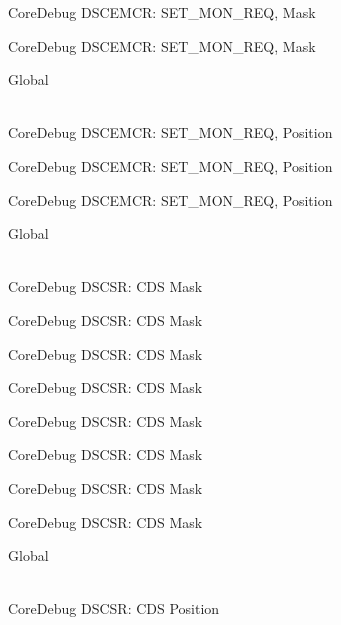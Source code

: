 \begin{DoxyRefList}
\label{deprecated__deprecated000527}%
%
Core\+Debug DSCEMCR\+: SET\+\_\+\+MON\+\_\+\+REQ, Mask 

\label{deprecated__deprecated000629}%
%
Core\+Debug DSCEMCR\+: SET\+\_\+\+MON\+\_\+\+REQ, Mask  
\item[{\parbox[t]{\linewidth}{Global \doxylink{group___c_m_s_i_s___s_c_b_ga77f02a6d773fa2c6daafbbdd7df2d9d2}{Core\+Debug\+\_\+\+DSCEMCR\+\_\+\+SET\+\_\+\+MON\+\_\+\+REQ\+\_\+\+Pos} }}]\hfill \\
\label{deprecated__deprecated000075}%
%
Core\+Debug DSCEMCR\+: SET\+\_\+\+MON\+\_\+\+REQ, Position 

\label{deprecated__deprecated000526}%
%
Core\+Debug DSCEMCR\+: SET\+\_\+\+MON\+\_\+\+REQ, Position 

\label{deprecated__deprecated000628}%
%
Core\+Debug DSCEMCR\+: SET\+\_\+\+MON\+\_\+\+REQ, Position  
\item[{\parbox[t]{\linewidth}{Global \doxylink{group___c_m_s_i_s___s_c_b_ga083417245e1aa40e84a2b12433a15a6b}{Core\+Debug\+\_\+\+DSCSR\+\_\+\+CDS\+\_\+\+Msk} }}]\hfill \\
\label{deprecated__deprecated000094}%
%
Core\+Debug DSCSR\+: CDS Mask 

\label{deprecated__deprecated000148}%
%
Core\+Debug DSCSR\+: CDS Mask 

\label{deprecated__deprecated000224}%
%
Core\+Debug DSCSR\+: CDS Mask 

\label{deprecated__deprecated000287}%
%
Core\+Debug DSCSR\+: CDS Mask 

\label{deprecated__deprecated000366}%
%
Core\+Debug DSCSR\+: CDS Mask 

\label{deprecated__deprecated000442}%
%
Core\+Debug DSCSR\+: CDS Mask 

\label{deprecated__deprecated000545}%
%
Core\+Debug DSCSR\+: CDS Mask 

\label{deprecated__deprecated000647}%
%
Core\+Debug DSCSR\+: CDS Mask  
\item[{\parbox[t]{\linewidth}{Global \doxylink{group___c_m_s_i_s___s_c_b_ga4be5d0f8af5d7d8ec04bde78ce18e10e}{Core\+Debug\+\_\+\+DSCSR\+\_\+\+CDS\+\_\+\+Pos} }}]\hfill \\
\label{deprecated__deprecated000093}%
%
Core\+Debug DSCSR\+: CDS Position 


\end{DoxyRefList}
